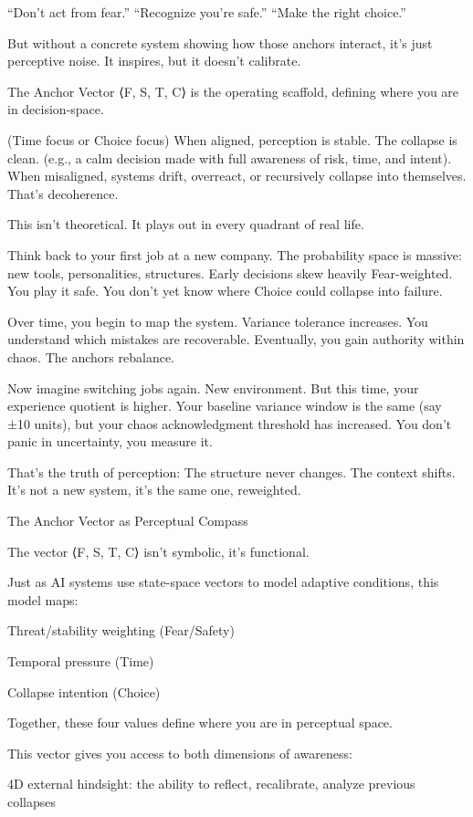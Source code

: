 \documentclass[12pt]{article}
\begin{document}
“Don’t act from fear.”
“Recognize you’re safe.”
“Make the right choice.”

But without a concrete system showing how those anchors interact, it’s just perceptive noise. It inspires, but it doesn’t calibrate.

The Anchor Vector ⟨F, S, T, C⟩ is the operating scaffold, defining where you are in decision-space.

(Time focus or Choice focus) 
When aligned, perception is stable. The collapse is clean. (e.g., a calm decision made with full awareness of risk, time, and intent). 
When misaligned, systems drift, overreact, or recursively collapse into themselves. That’s decoherence.

This isn’t theoretical. It plays out in every quadrant of real life.

Think back to your first job at a new company. The probability space is massive: new tools, personalities, structures. Early decisions skew heavily Fear-weighted. You play it safe. You don’t yet know where Choice could collapse into failure.

Over time, you begin to map the system. Variance tolerance increases. You understand which mistakes are recoverable. Eventually, you gain authority within chaos. The anchors rebalance.

Now imagine switching jobs again. New environment. But this time, your experience quotient is higher. Your baseline variance window is the same (say ±10 units), but your chaos acknowledgment threshold has increased. You don’t panic in uncertainty, you measure it.

That’s the truth of perception: The structure never changes. The context shifts.
It’s not a new system, it’s the same one, reweighted.


The Anchor Vector as Perceptual Compass

The vector ⟨F, S, T, C⟩ isn’t symbolic, it’s functional.

Just as AI systems use state-space vectors to model adaptive conditions, this model maps:

Threat/stability weighting (Fear/Safety)

Temporal pressure (Time)

Collapse intention (Choice)

Together, these four values define where you are in perceptual space.

This vector gives you access to both dimensions of awareness:

4D external hindsight: the ability to reflect, recalibrate, analyze previous collapses
\end{document}
